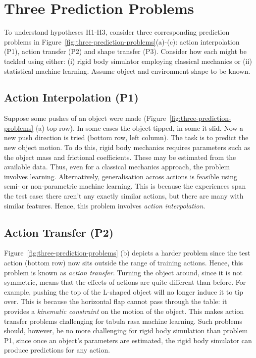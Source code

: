 \section{Three Prediction Problems}
\label{sec:schema}

To understand hypotheses H1-H3, consider three corresponding prediction problems in Figure~\ref{fig:three-prediction-problems}(a)-(c): action interpolation (P1), action transfer (P2) and shape transfer (P3). Consider how each might be tackled using either: (i) rigid body simulator employing classical mechanics or (ii) statistical machine learning. Assume object and environment shape to be known.

\subsection{Action Interpolation (P1)} Suppose some pushes of an object were made (Figure~\ref{fig:three-prediction-problems} (a) top row). In some cases the object tipped, in some it slid. Now a new push direction is tried (bottom row, left column). The task is to predict the new object motion. To do this, rigid body mechanics requires parameters such as the object mass and frictional coefficients. These may be estimated from the available data. Thus, even for a classical mechanics approach, the problem involves learning. Alternatively, generalisation across actions is feasible using semi- or non-parametric machine learning. This is because the experiences span the test case: there aren't any exactly similar actions, but there are many with similar features. Hence, this problem involves {\em action interpolation}.

\subsection{Action Transfer (P2)} Figure~\ref{fig:three-prediction-problems} (b) depicts a harder problem since the test action (bottom row) now sits outside the range of training actions. Hence, this problem is known as {\em action transfer}. Turning the object around, since it is not symmetric, means that the effects of actions are quite different than before. For example, pushing the top of the L-shaped object will no longer induce it to tip over. This is because the horizontal flap cannot pass through the table: it provides a {\em kinematic constraint} on the motion of the object. This makes action transfer problems challenging for tabula rasa machine learning. Such problems should, however, be no more challenging for rigid body simulation than problem P1, since once an object's parameters are estimated, the rigid body simulator can produce predictions for any action.

